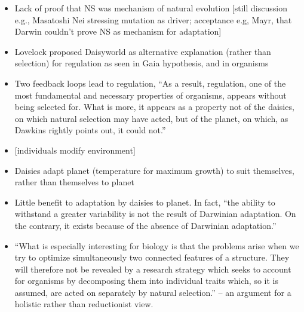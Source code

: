 \autocite{Saunders1994}

\begin{itemize}
	\item
	
	Lack of proof that NS was mechanism of natural evolution {[}still
	discussion e.g., Masatoshi Nei stressing mutation as driver;
	acceptance e.g, Mayr, that Darwin couldn't prove NS as mechanism for
	adaptation{]}
	
	\item
	
	Lovelock proposed Daisyworld as alternative explanation (rather than
	selection) for regulation as seen in Gaia hypothesis, and in organisms
	
	\item
	
	Two feedback loops lead to regulation, ``As a result, regulation, one
	of the most fundamental and necessary properties of organisms, appears
	without being selected for. What is more, it appears as a property not
	of the daisies, on which natural selection may have acted, but of the
	planet, on which, as Dawkins rightly points out, it could not.''
	
	\item
	
	{[}individuals modify environment{]}
	
	\item
	
	Daisies adapt planet (temperature for maximum growth) to suit
	themselves, rather than themselves to planet
	
	\item
	
	Little benefit to adaptation by daisies to planet. In fact, ``the
	ability to withstand a greater variability is not the result of
	Darwinian adaptation. On the contrary, it exists because of the
	absence of Darwinian adaptation.''
	
	\item
	
	``What is especially interesting for biology is that the problems
	arise when we try to optimize simultaneously two connected features of
	a structure. They will therefore not be revealed by a research
	strategy which seeks to account for organisms by decomposing them into
	individual traits which, so it is assumed, are acted on separately by
	natural selection.'' -- an argument for a holistic rather than reductionist view.
	
\end{itemize}


